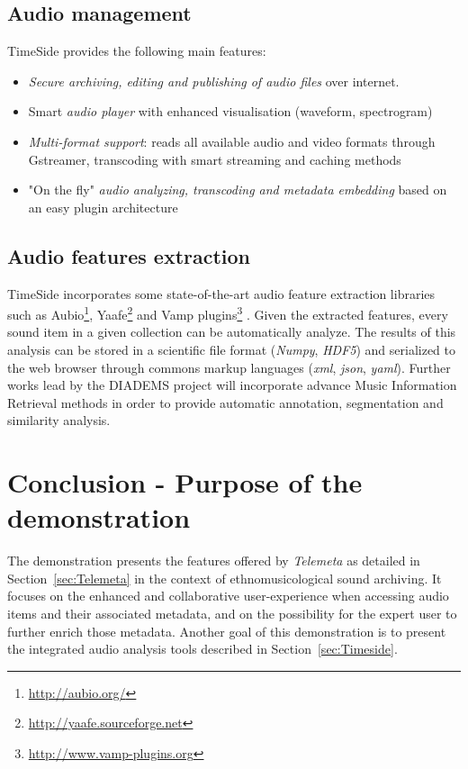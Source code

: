\documentclass{aes53i}
\begin{document}
\subsection{Audio management}
TimeSide provides the following main features:
\begin{itemize}
\item \emph{Secure archiving, editing and publishing of audio files} over
  internet.
\item Smart \emph{audio player} with enhanced visualisation (waveform, spectrogram)
\item \emph{Multi-format support}: reads all available audio and video formats  through Gstreamer, transcoding with smart streaming and caching methods%
\item "On the fly" \emph{audio analyzing, transcoding and metadata
    embedding} based on an easy plugin architecture
\end{itemize}

\subsection{Audio features extraction}
TimeSide incorporates some state-of-the-art audio feature extraction libraries such as Aubio\footnote{\url{http://aubio.org/}}, Yaafe\footnote{\url{http://yaafe.sourceforge.net}} and Vamp plugins\footnote{ \url{http://www.vamp-plugins.org}} \cite{brossierPhD,yaafe_ISMIR2010,vamp-plugins}.
Given the extracted features, every sound item in a given collection can be automatically analyze. The results of this analysis can be stored in a scientific file format (\emph{Numpy}, \emph{HDF5}) and serialized to the web browser through commons markup languages (\emph{xml}, \emph{json}, \emph{yaml}).
Further works lead by the DIADEMS project will incorporate advance Music Information Retrieval methods in order to provide automatic annotation, segmentation and similarity analysis.

\section{Conclusion - Purpose of the demonstration}\vspace{-0.1cm}
The demonstration presents the features offered by \emph{Telemeta} as detailed in Section~\ref{sec:Telemeta} in the context of ethnomusicological sound archiving.%
It focuses on the enhanced and collaborative user-experience when accessing audio items and their associated metadata, and on the possibility for the expert user to further enrich those metadata.
Another goal of this demonstration is to present the integrated audio analysis tools described in Section~\ref{sec:Timeside}.
\vspace{-0.2cm}
\end{document}
